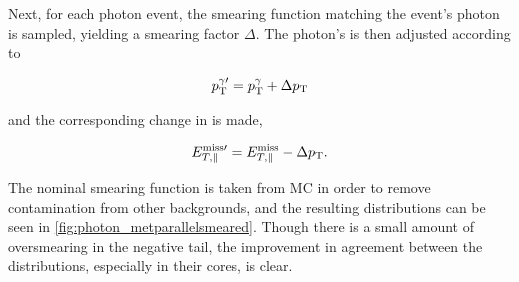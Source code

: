 Next, for each photon event, the smearing function matching the event's photon \pt is sampled, yielding a smearing factor $\Delta$\pt. The photon's \pt is then adjusted according to 

\begin{equation}
p_{\text{T}}^{\gamma\prime} = p_{\text{T}}^\gamma + \Delta p_{\text{T}} 
\end{equation} 

and the corresponding change in \met is made,

\begin{equation}
E_{T,\parallel}^{\text{miss}\prime} = E_{T,\parallel}^{\mathrm{miss}} - \Delta p_{\text{T}}.
\end{equation}

The nominal smearing function is taken from \ac{MC} in order to remove contamination from other backgrounds, and the resulting \metl distributions can be seen in \autoref{fig:photon_metparallelsmeared}. Though there is a small amount of oversmearing in the negative tail, the improvement in agreement between the distributions, especially in their cores, is clear.

